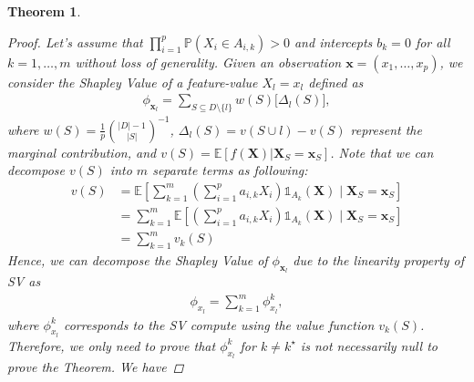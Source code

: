 \documentclass{article}
\newcommand\XS{\boldsymbol{X}_S}
\newcommand\X{\boldsymbol{X}}
\newcommand\xs{\boldsymbol{x}_S}
\newcommand\x{\boldsymbol{x}}
\theoremstyle{plain}
\newtheorem{theorem}{Theorem}[section]
\theoremstyle{definition}
\theoremstyle{remark}
\begin{document}
\begin{theorem}
    \begin{proof}
    Let's assume that $\prod_{i=1}^p \mathbb{P}(X_i \in A_{i, k}) > 0$ and intercepts $b_k = 0$ for all $k=1,\dots, m$ without loss of generality. Given an observation $\x = (x_1, \dots, x_p)$, we consider the Shapley Value of a feature-value $X_l = x_l$ defined as
    \begin{align*}
        \phi_{\x_l} =  \sum_{S \subseteq D\setminus\{l\}} w(S) \Big[ \Delta_l(S) \Big], 
    \end{align*}
    where $w(S)= \frac{1}{p} \binom{|D|-1}{|S|}^{-1}$, $\Delta_l(S) = v(S \cup l) - v(S)$ represent the marginal contribution, and $v(S) = \mathbb{E}\left[ f(\X) | \XS = \xs \right]$. Note that we can decompose $v(S)$ into $m$ separate terms as following:
    \begin{align*}
        v(S) & = \mathbb{E}\left[ \sum_{k=1}^m \left(\sum_{i=1}^p a_{i, k} X_i \right)\mathds{1}_{A_k}(\X) \;|\; \XS = \xs \right] \\
            & = \sum_{k=1}^m \mathbb{E}\left[\left(\sum_{i=1}^p a_{i, k} X_i \right)\mathds{1}_{A_k}(\X) \;|\; \XS = \xs \right] \\
            & = \sum_{k=1}^m v_k(S)
    \end{align*}
    Hence, we can decompose the Shapley Value of $\phi_{\x_l}$ due to the linearity property of SV as
    \begin{align*}
        \phi_{x_l} = \sum_{k=1}^m \phi^k_{x_l},
    \end{align*}
    where $\phi^k_{x_l}$ corresponds to the SV compute using the value function $v_k(S)$.  Therefore, we only need to prove that $\phi^k_{x_l}$ for $k \neq k^\star$ is not necessarily null to prove the Theorem. We have


\end{proof}
\end{theorem}
\end{document}
